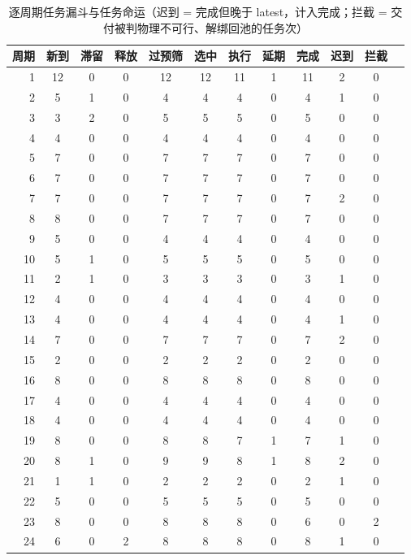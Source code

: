\documentclass[a4paper,11pt]{article}
\begin{document}
\begin{table}[htbp]\centering
\caption{逐周期任务漏斗与任务命运（迟到 = 完成但晚于 latest，计入完成；拦截 = 交付被判物理不可行、解绑回池的任务次）}
\label{tab:exp01-funnel}
\begin{tabular}{rccccccccccc}
\toprule
周期 & 新到 & 滞留 & 释放 & 过预筛 & 选中 & 执行 & 延期 & 完成 & 迟到 & 拦截 \\
\midrule
1 & 12 & 0 & 0 & 12 & 12 & 11 & 1 & 11 & 2 & 0 \\
2 & 5 & 1 & 0 & 4 & 4 & 4 & 0 & 4 & 1 & 0 \\
3 & 3 & 2 & 0 & 5 & 5 & 5 & 0 & 5 & 0 & 0 \\
4 & 4 & 0 & 0 & 4 & 4 & 4 & 0 & 4 & 0 & 0 \\
5 & 7 & 0 & 0 & 7 & 7 & 7 & 0 & 7 & 0 & 0 \\
6 & 7 & 0 & 0 & 7 & 7 & 7 & 0 & 7 & 0 & 0 \\
7 & 7 & 0 & 0 & 7 & 7 & 7 & 0 & 7 & 2 & 0 \\
8 & 8 & 0 & 0 & 7 & 7 & 7 & 0 & 7 & 0 & 0 \\
9 & 5 & 0 & 0 & 4 & 4 & 4 & 0 & 4 & 0 & 0 \\
10 & 5 & 1 & 0 & 5 & 5 & 5 & 0 & 5 & 0 & 0 \\
11 & 2 & 1 & 0 & 3 & 3 & 3 & 0 & 3 & 1 & 0 \\
12 & 4 & 0 & 0 & 4 & 4 & 4 & 0 & 4 & 0 & 0 \\
13 & 4 & 0 & 0 & 4 & 4 & 4 & 0 & 4 & 1 & 0 \\
14 & 7 & 0 & 0 & 7 & 7 & 7 & 0 & 7 & 2 & 0 \\
15 & 2 & 0 & 0 & 2 & 2 & 2 & 0 & 2 & 0 & 0 \\
16 & 8 & 0 & 0 & 8 & 8 & 8 & 0 & 8 & 0 & 0 \\
17 & 4 & 0 & 0 & 4 & 4 & 4 & 0 & 4 & 0 & 0 \\
18 & 4 & 0 & 0 & 4 & 4 & 4 & 0 & 4 & 0 & 0 \\
19 & 8 & 0 & 0 & 8 & 8 & 7 & 1 & 7 & 1 & 0 \\
20 & 8 & 1 & 0 & 9 & 9 & 8 & 1 & 8 & 2 & 0 \\
21 & 1 & 1 & 0 & 2 & 2 & 2 & 0 & 2 & 1 & 0 \\
22 & 5 & 0 & 0 & 5 & 5 & 5 & 0 & 5 & 0 & 0 \\
23 & 8 & 0 & 0 & 8 & 8 & 8 & 0 & 6 & 0 & 2 \\
24 & 6 & 0 & 2 & 8 & 8 & 8 & 0 & 8 & 1 & 0 \\
\bottomrule
\end{tabular}
\end{table}
\end{document}
